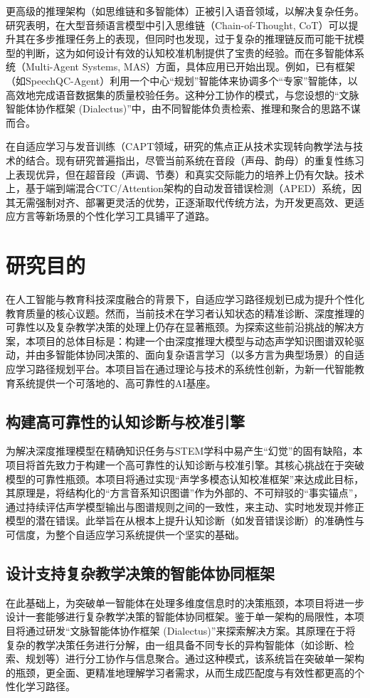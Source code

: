 更高级的推理架构（如思维链和多智能体）正被引入语音领域，以解决复杂任务。研究表明，在大型音频语言模型中引入思维链（Chain-of-Thought, CoT）可以提升其在多步推理任务上的表现，但同时也发现，过于复杂的推理链反而可能干扰模型的判断，这为如何设计有效的认知校准机制提供了宝贵的经验。而在多智能体系统（Multi-Agent Systems, MAS）方面，具体应用已开始出现。例如，已有框架（如SpeechQC-Agent）利用一个中心“规划”智能体来协调多个“专家”智能体，以高效地完成语音数据集的质量校验任务。这种分工协作的模式，与您设想的“文脉智能体协作框架 (Dialectus)”中，由不同智能体负责检索、推理和聚合的思路不谋而合。

在自适应学习与发音训练（CAPT领域，研究的焦点正从技术实现转向教学法与技术的结合。现有研究普遍指出，尽管当前系统在音段（声母、韵母）的重复性练习上表现优异，但在超音段（声调、节奏）和真实交际能力的培养上仍有欠缺。技术上，基于端到端混合CTC/Attention架构的自动发音错误检测（APED）系统，因其无需强制对齐、部署更灵活的优势，正逐渐取代传统方法，为开发更高效、更适应方言等新场景的个性化学习工具铺平了道路。

\section{研究目的}

在人工智能与教育科技深度融合的背景下，自适应学习路径规划已成为提升个性化教育质量的核心议题。然而，当前技术在学习者认知状态的精准诊断、深度推理的可靠性以及复杂教学决策的处理上仍存在显著瓶颈。为探索这些前沿挑战的解决方案，本项目的总体目标是：构建一个由深度推理大模型与动态声学知识图谱双轮驱动，并由多智能体协同决策的、面向复杂语言学习（以多方言为典型场景）的自适应学习路径规划平台。本项目旨在通过理论与技术的系统性创新，为新一代智能教育系统提供一个可落地的、高可靠性的AI基座。

\subsection{构建高可靠性的认知诊断与校准引擎}
为解决深度推理模型在精确知识任务与STEM学科中易产生“幻觉”的固有缺陷，本项目将首先致力于构建一个高可靠性的认知诊断与校准引擎。其核心挑战在于突破模型的可靠性瓶颈。本项目将通过实现“声学多模态认知校准框架”来达成此目标，其原理是，将结构化的“方言音系知识图谱”作为外部的、不可辩驳的“事实锚点”，通过持续评估声学模型输出与图谱规则之间的一致性，来主动、实时地发现并修正模型的潜在错误。此举旨在从根本上提升认知诊断（如发音错误诊断）的准确性与可信度，为整个自适应学习系统提供一个坚实的基础。

\subsection{设计支持复杂教学决策的智能体协同框架}
在此基础上，为突破单一智能体在处理多维度信息时的决策瓶颈，本项目将进一步设计一套能够进行复杂教学决策的智能体协同框架。鉴于单一架构的局限性，本项目将通过研发“文脉智能体协作框架 (Dialectus)”来探索解决方案。其原理在于将复杂的教学决策任务进行分解，由一组具备不同专长的异构智能体（如诊断、检索、规划等）进行分工协作与信息聚合。通过这种模式，该系统旨在突破单一架构的瓶颈，更全面、更精准地理解学习者需求，从而生成匹配度与有效性都更高的个性化学习路径。


